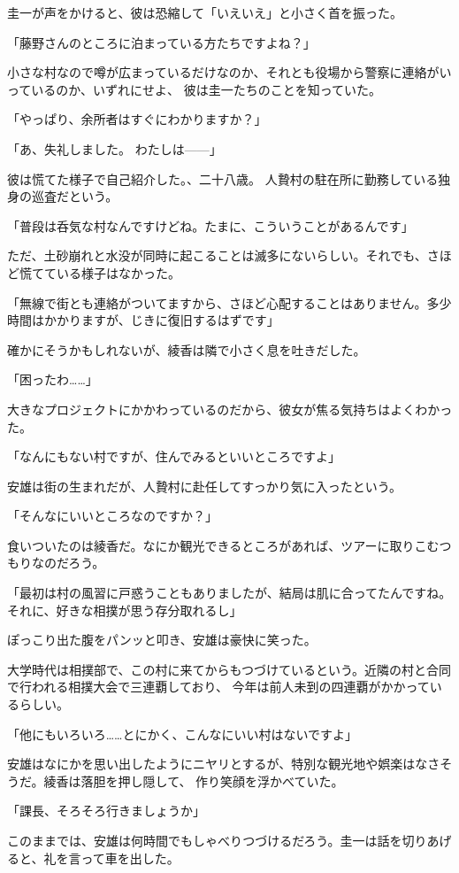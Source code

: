 ﻿\documentclass[
    book,tate,
    line_length=30zw,
    jafontsize=12pt,
    paper=b5j,
    landscape,
    ]{jlreq}
\begin{document}
圭一が声をかけると、彼は恐縮して「いえいえ」と小さく首を振った。

「藤野さんのところに泊まっている方たちですよね？」

小さな村なので噂が広まっているだけなのか、それとも役場から警察に連絡がいっているのか、いずれにせよ、
彼は圭一たちのことを知っていた。

「やっぱり、余所者はすぐにわかりますか？」

「あ、失礼しました。 わたしは------」

彼は慌てた様子で自己紹介した。、二十八歳。 
人贄村の駐在所に勤務している独身の巡査だという。

「普段は呑気な村なんですけどね。たまに、こういうことがあるんです」

ただ、土砂崩れと水没が同時に起こることは滅多にないらしい。それでも、さほど慌てている様子はなかった。

「無線で街とも連絡がついてますから、さほど心配することはありません。多少時間はかかりますが、じきに復旧するはずです」

確かにそうかもしれないが、綾香は隣で小さく息を吐きだした。

「困ったわ……」

大きなプロジェクトにかかわっているのだから、彼女が焦る気持ちはよくわかった。

「なんにもない村ですが、住んでみるといいところですよ」

安雄は街の生まれだが、人贄村に赴任してすっかり気に入ったという。

「そんなにいいところなのですか？」

食いついたのは綾香だ。なにか観光できるところがあれば、ツアーに取りこむつもりなのだろう。

「最初は村の風習に戸惑うこともありましたが、結局は肌に合ってたんですね。
それに、好きな相撲が思う存分取れるし」

ぽっこり出た腹をパンッと叩き、安雄は豪快に笑った。

大学時代は相撲部で、この村に来てからもつづけているという。近隣の村と合同で行われる相撲大会で三連覇しており、
今年は前人未到の四連覇がかかっているらしい。

「他にもいろいろ……とにかく、こんなにいい村はないですよ」

安雄はなにかを思い出したようにニヤリとするが、特別な観光地や娯楽はなさそうだ。綾香は落胆を押し隠して、
作り笑顔を浮かべていた。

「課長、そろそろ行きましょうか」

このままでは、安雄は何時間でもしゃべりつづけるだろう。圭一は話を切りあげると、礼を言って車を出した。
\end{document}
